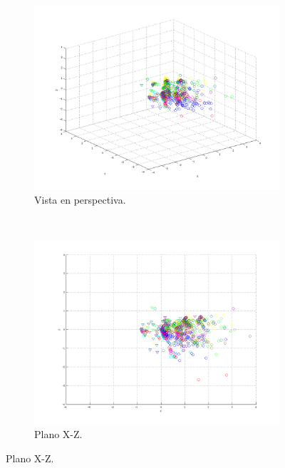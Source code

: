 \documentclass[informe.tex]{subfiles}
\begin{document}
	
	\begin{figure}[H]
        \centering
        \hspace*{-6.5cm}
        \begin{subfigure}[b]{0.49\textwidth}
                \includegraphics[width=\textwidth]{graficos/fold2_criterioParadao_reglas_alpha0_rep4_0P.png}
                \caption{Vista en perspectiva.}
        \end{subfigure}%
        ~
        \begin{subfigure}[b]{0.49\textwidth}
                \includegraphics[width=\textwidth]{graficos/fold2_criterioParadao_reglas_alpha0_rep4_1XZ.png}
                \caption{Plano X-Z.}
        \end{subfigure}
        

\end{figure}
\end{document}
